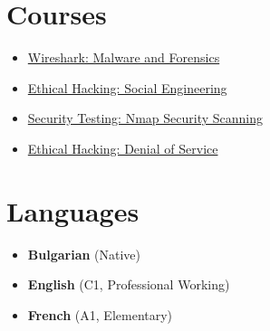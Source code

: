 \documentclass[a4paper, 10pt]{article}
\begin{document}
	\begin{center}
		\begin{minipage}[t]{0.5\textwidth}
			\section*{Courses}
			\begin{itemize}
				

				
				\item \href{https://raw.githubusercontent.com/svetlyobg/LaTeX-CV/main/Wireshark%20Malware%20and%20Forensics.png}{Wireshark: Malware and Forensics}
				
				\item \href{https://raw.githubusercontent.com/svetlyobg/LaTeX-CV/main/EthicalHackingSocialEngineering.png}{Ethical
					Hacking: Social Engineering}
				
				\item \href{https://raw.githubusercontent.com/svetlyobg/LaTeX-CV/main/SecurityTesting-NmapSecurityScanning.png}{Security
					Testing: Nmap Security Scanning}
				
				\item \href{https://raw.githubusercontent.com/svetlyobg/LaTeX-CV/main/EthicalHacking-DenialofService.png}{Ethical
					Hacking: Denial of Service}
			\end{itemize}
		\end{minipage}%
		\begin{minipage}[t]{0.5\textwidth}
			\section*{Languages}
			\begin{itemize}
				\item \textbf{Bulgarian} (Native)
				
				\item \textbf{English} (C1, Professional Working)
				
				\item \textbf{French} (A1, Elementary)
			\end{itemize}
		\end{minipage}
	\end{center}
	
\iffalse %
\end{document}
